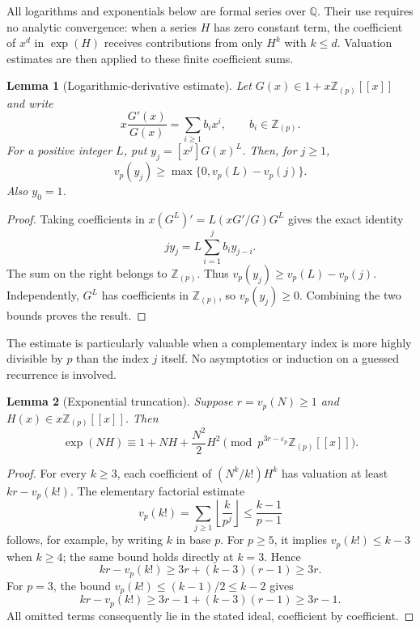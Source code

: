 \documentclass[11pt,a4paper]{article}
\numberwithin{equation}{section}
\newtheorem{lemma}[lemma]{Lemma}
\theoremstyle{definition}
\theoremstyle{remark}
\newcommand{\Z}{\mathbb Z}
\newcommand{\Q}{\mathbb Q}
\newcommand{\Zp}{\Z_{(p)}}
\newcommand{\vp}{v_p}
\newcommand{\epsp}{\varepsilon_p}
\begin{document}
All logarithms and exponentials below are formal series over $\Q$.
Their use requires no analytic convergence: when a series $H$ has zero
constant term, the coefficient of $x^d$ in $\exp(H)$ receives
contributions from only $H^k$ with $k\leq d$. Valuation estimates are
then applied to these finite coefficient sums.

\begin{lemma}[Logarithmic-derivative estimate]\label{lem:derivative}
Let $G(x)\in1+x\Zp[[x]]$ and write
\[
 x\frac{G'(x)}{G(x)}=\sum_{i\geq1}b_i x^i,
 \qquad b_i\in\Zp.
\]
For a positive integer $L$, put $y_j=[x^j]G(x)^L$. Then, for $j\geq1$,
\begin{equation}\label{eq:derivative-bound}
 \vp(y_j)\geq\max\{0,\vp(L)-\vp(j)\}.
\end{equation}
Also $y_0=1$.
\end{lemma}
\begin{proof}
Taking coefficients in
$x(G^L)'=L(xG'/G)G^L$ gives the exact identity
\begin{equation}\label{eq:derivative-coeff}
 j y_j=L\sum_{i=1}^{j}b_i y_{j-i}.
\end{equation}
The sum on the right belongs to $\Zp$. Thus
$\vp(y_j)\geq\vp(L)-\vp(j)$. Independently, $G^L$ has coefficients in
$\Zp$, so $\vp(y_j)\geq0$. Combining the two bounds proves the result.
\end{proof}

The estimate is particularly valuable when a complementary index is
more highly divisible by $p$ than the index $j$ itself. No asymptotics or
induction on a guessed recurrence is involved.

\begin{lemma}[Exponential truncation]\label{lem:tail}
Suppose $r=\vp(N)\geq1$ and $H(x)\in x\Zp[[x]]$. Then
\begin{equation}\label{eq:tail}
 \exp(NH)\equiv1+NH+\frac{N^2}{2}H^2
 \pmod{p^{3r-\epsp}\Zp[[x]]}.
\end{equation}
\end{lemma}
\begin{proof}
For every $k\geq3$, each coefficient of $(N^k/k!)H^k$ has valuation at
least $kr-\vp(k!)$. The elementary factorial estimate
\[
 \vp(k!)=\sum_{j\geq1}\left\lfloor\frac{k}{p^j}\right\rfloor
 \leq\frac{k-1}{p-1}
\]
follows, for example, by writing $k$ in base $p$.
For $p\geq5$, it implies $\vp(k!)\leq k-3$ when $k\geq4$;
the same bound holds directly at $k=3$. Hence
\[
 kr-\vp(k!)\geq3r+(k-3)(r-1)\geq3r.
\]
For $p=3$, the bound $\vp(k!)\leq(k-1)/2\leq k-2$ gives
\[
 kr-\vp(k!)\geq3r-1+(k-3)(r-1)\geq3r-1.
\]
All omitted terms consequently lie in the stated ideal, coefficient by
coefficient.
\end{proof}
\end{document}
